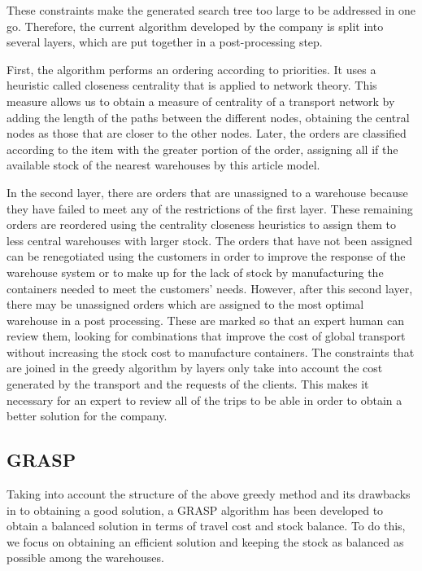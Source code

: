 \documentclass[letterpaper]{article} %
\begin{document}
These constraints make the generated search tree too large to be addressed in one go. Therefore, the current algorithm developed by the company is split into several layers, which are put together in a post-processing step.

 First, the algorithm performs an ordering according to priorities. It uses a heuristic called closeness centrality that is applied to network theory. This measure allows us to obtain a measure of centrality of a transport network by adding the length of the paths between the different nodes, obtaining the central nodes as those that are closer to the other nodes. Later, the orders are classified according to the item with the greater portion of the order, assigning all if the available stock of the nearest warehouses by this article model.

In the second layer, there are orders that are unassigned to a warehouse because they have failed to meet any of the restrictions of the first layer. These remaining orders are reordered using the centrality closeness heuristics to assign them to less central warehouses with larger stock. The orders that have not been assigned can be renegotiated using the customers in order to improve the response of the warehouse system or to make up for the lack of stock by manufacturing the containers needed to meet the customers' needs. However, after this second layer, there may be unassigned orders which are assigned to the most optimal warehouse in a post processing. These are marked so that an expert human can review them, looking for combinations that improve the cost of global transport without increasing the stock cost to manufacture containers.
The constraints that are joined in the greedy algorithm by layers only take into account the cost generated by the transport and the requests of the clients. This makes it necessary for an expert to review all of the trips to be able in order to obtain a better solution for the company.

\subsection*{GRASP}

Taking into account the structure of the above greedy method and its drawbacks in to obtaining a good solution, a GRASP algorithm has been developed to obtain a balanced solution in terms of travel cost and stock balance. To do this, we focus on obtaining an efficient solution and keeping the stock as balanced as possible among the warehouses.
\end{document}
